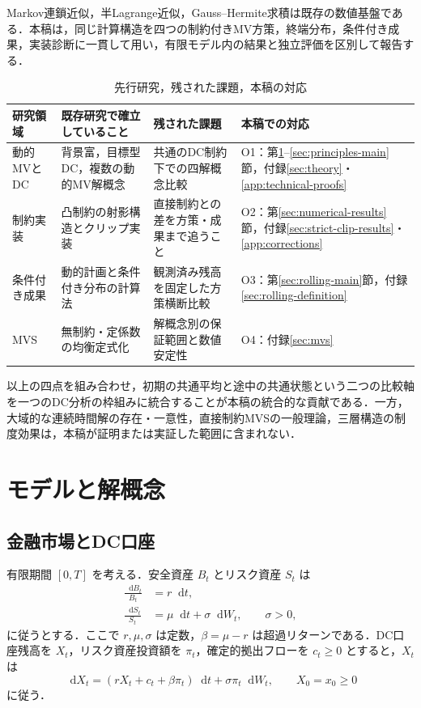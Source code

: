 \documentclass[10pt,a4paper]{article}
\theoremstyle{plain}
\theoremstyle{definition}
\newcommand{\dd}{\mathop{}\!\mathrm{d}}
\begin{document}
Markov連鎖近似，半Lagrange近似，Gauss--Hermite求積は既存の数値基盤である\citep{KushnerDupuis2001,FalconeFerretti2014,AbramowitzStegun1972,Judd1998}．本稿は，同じ計算構造を四つの制約付きMV方策，終端分布，条件付き成果，実装診断に一貫して用い，有限モデル内の結果と独立評価を区別して報告する．

\begin{table}[htbp]
\centering\scriptsize
\caption{先行研究，残された課題，本稿の対応}
\label{tab:literature-positioning}
\begin{tabularx}{\textwidth}{p{24mm}p{39mm}p{42mm}X}
\toprule
研究領域 & 既存研究で確立していること & 残された課題 & 本稿での対応 \\
\midrule
動的MVとDC
& 背景富，目標型DC，複数の動的MV解概念
& 共通のDC制約下での四解概念比較
& O1：第\ref{sec:model}--\ref{sec:principles-main}節，付録\ref{sec:theory}・\ref{app:technical-proofs} \\
制約実装
& 凸制約の射影構造とクリップ実装
& 直接制約との差を方策・成果まで追うこと
& O2：第\ref{sec:numerical-results}節，付録\ref{sec:strict-clip-results}・\ref{app:corrections} \\
条件付き成果
& 動的計画と条件付き分布の計算法
& 観測済み残高を固定した方策横断比較
& O3：第\ref{sec:rolling-main}節，付録\ref{sec:rolling-definition} \\
MVS
& 無制約・定係数の均衡定式化
& 解概念別の保証範囲と数値安定性
& O4：付録\ref{sec:mvs} \\
\bottomrule
\end{tabularx}
\end{table}

以上の四点を組み合わせ，初期の共通平均と途中の共通状態という二つの比較軸を一つのDC分析の枠組みに統合することが本稿の統合的な貢献である．一方，大域的な連続時間解の存在・一意性，直接制約MVSの一般理論，三層構造の制度効果は，本稿が証明または実証した範囲に含まれない．

\section{モデルと解概念}
\label{sec:model}

\subsection{金融市場とDC口座}

有限期間 $[0,T]$ を考える．安全資産 $B_t$ とリスク資産 $S_t$ は
\begin{align}
  \frac{\dd B_t}{B_t}&=r\dd t,\label{eq:riskless}\\
  \frac{\dd S_t}{S_t}&=\mu\dd t+\sigma\dd W_t,\qquad \sigma>0,\label{eq:risky}
\end{align}
に従うとする．ここで $r,\mu,\sigma$ は定数，$\beta=\mu-r$ は超過リターンである．DC口座残高を $X_t$，リスク資産投資額を $\pi_t$，確定的拠出フローを $c_t\geq0$ とすると，$X_t$ は
\begin{equation}
  \dd X_t=(rX_t+c_t+\beta\pi_t)\dd t+\sigma\pi_t\dd W_t,
  \qquad X_0=x_0\geq0
  \label{eq:X-dynamics}
\end{equation}
に従う．
\end{document}
